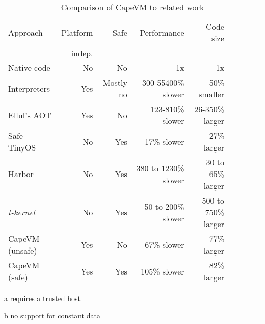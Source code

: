 \begin{table}
\caption{Comparison of CapeVM to related work}
\label{tbl-contribution-comparison}
    \begin{threeparttable}
    \begin{tabular}{lrrrrrrrr} %
    \toprule
    Approach          & Platform    & Safe               & Performance           & Code size                  \\
                      & indep.      &                    &                       &                            \\
    \midrule
    \midrule
    Native code       & No          & No                 & 1x                    & 1x                         \\
    Interpreters      & Yes         & Mostly no          & 300-55400\% slower    & ~50\% smaller \tnote{b}    \\ 
    Ellul's AOT       & Yes         & No                 & 123-810\% slower      & 26-350\% larger \tnote{b}  \\
    Safe TinyOS       & No          & Yes \tnote{a}      & 17\% slower           & 27\% larger                \\
    Harbor            & No          & Yes                & 380 to 1230\% slower  & 30 to 65\% larger          \\
    \emph{t-kernel}   & No          & Yes                & 50 to 200\% slower    & 500 to 750\% larger        \\
    CapeVM (unsafe)   & Yes         & No                 & 67\% slower           & 77\% larger                \\ %
    CapeVM (safe)     & Yes         & Yes                & 105\% slower          & 82\% larger                \\ %
    \bottomrule
    \end{tabular}
    \begin{tablenotes}
        \item[a] requires a trusted host
        \item[b] no support for constant data
    \end{tablenotes}
    \end{threeparttable}
\end{table}

